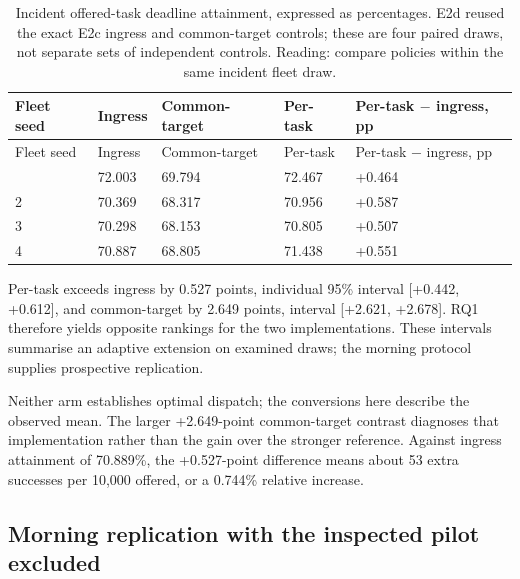 \documentclass[12pt,a4paper]{article}
\begin{document}
\begingroup
\singlespacing\footnotesize\setlength{\tabcolsep}{3pt}
\renewcommand{\thetable}{4}
\begin{xltabular}{\textwidth}{@{}YYYYY@{}}
\caption[Incident attainment]{Incident offered-task deadline attainment, expressed as percentages. E2d reused the exact E2c ingress and common-target controls; these are four paired draws, not separate sets of independent controls. Reading: compare policies within the same incident fleet draw.}\label{tab:4} \\
\toprule
Fleet seed & Ingress & Common-target & Per-task & Per-task \ensuremath{-} ingress, pp \\
\midrule\endfirsthead
\toprule
Fleet seed & Ingress & Common-target & Per-task & Per-task \ensuremath{-} ingress, pp \\
\midrule\endhead
\bottomrule{} & 72.003 & 69.794 & 72.467 & +0.464 \\
2 & 70.369 & 68.317 & 70.956 & +0.587 \\
3 & 70.298 & 68.153 & 70.805 & +0.507 \\
4 & 70.887 & 68.805 & 71.438 & +0.551 \\
\end{xltabular}
\endgroup

Per-task exceeds ingress by 0.527 points, individual 95\% interval [+0.442, +0.612], and common-target by 2.649 points, interval [+2.621, +2.678]. RQ1 therefore yields opposite rankings for the two implementations. These intervals summarise an adaptive extension on examined draws; the morning protocol supplies prospective replication.

Neither arm establishes optimal dispatch; the conversions here describe the observed mean. The larger +2.649-point common-target contrast diagnoses that implementation rather than the gain over the stronger reference. Against ingress attainment of 70.889\%, the +0.527-point difference means about 53 extra successes per 10,000 offered, or a 0.744\% relative increase.

\FloatBarrier
\subsection{Morning replication with the inspected pilot excluded}\label{sec:3.3}
\end{document}
